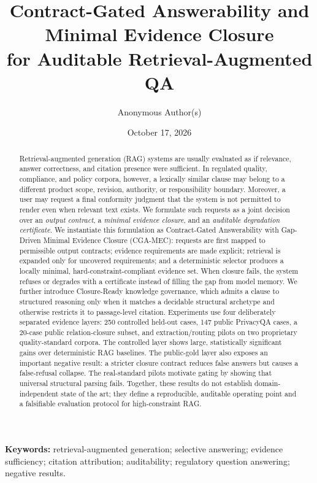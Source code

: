 \documentclass[11pt]{article}
\title{Contract-Gated Answerability and Minimal Evidence Closure\\ for Auditable Retrieval-Augmented QA}
\author{Anonymous Author(s)}
\date{October 17, 2026}
\newcommand{\method}{CGA-MEC}
\begin{document}
\maketitle

\begin{abstract}
Retrieval-augmented generation (RAG) systems are usually evaluated as if relevance, answer correctness, and citation presence were sufficient. In regulated quality, compliance, and policy corpora, however, a lexically similar clause may belong to a different product scope, revision, authority, or responsibility boundary. Moreover, a user may request a final conformity judgment that the system is not permitted to render even when relevant text exists. We formulate such requests as a joint decision over an \emph{output contract}, a \emph{minimal evidence closure}, and an \emph{auditable degradation certificate}. We instantiate this formulation as Contract-Gated Answerability with Gap-Driven Minimal Evidence Closure (\method{}): requests are first mapped to permissible output contracts; evidence requirements are made explicit; retrieval is expanded only for uncovered requirements; and a deterministic selector produces a locally minimal, hard-constraint-compliant evidence set. When closure fails, the system refuses or degrades with a certificate instead of filling the gap from model memory. We further introduce Closure-Ready knowledge governance, which admits a clause to structured reasoning only when it matches a decidable structural archetype and otherwise restricts it to passage-level citation. Experiments use four deliberately separated evidence layers: 250 controlled held-out cases, 147 public PrivacyQA cases, a 20-case public relation-closure subset, and extraction/routing pilots on two proprietary quality-standard corpora. The controlled layer shows large, statistically significant gains over deterministic RAG baselines. The public-gold layer also exposes an important negative result: a stricter closure contract reduces false answers but causes a false-refusal collapse. The real-standard pilots motivate gating by showing that universal structural parsing fails. Together, these results do not establish domain-independent state of the art; they define a reproducible, auditable operating point and a falsifiable evaluation protocol for high-constraint RAG.
\end{abstract}

\noindent\textbf{Keywords:} retrieval-augmented generation; selective answering; evidence sufficiency; citation attribution; auditability; regulatory question answering; negative results.
\end{document}
